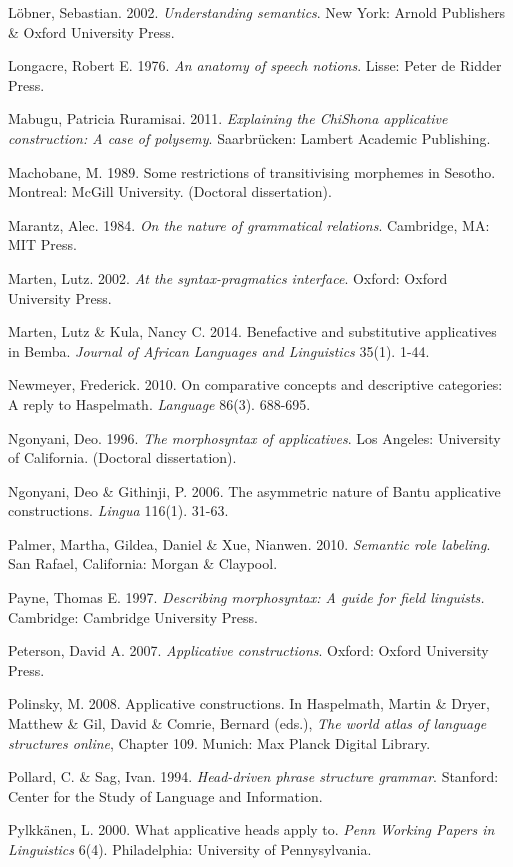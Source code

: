 \documentclass[output=paper]{langsci/langscibook}
\begin{document}
Löbner, Sebastian. 2002. \textit{Understanding semantics}. New York: Arnold Publishers \& Oxford University Press.

Longacre, Robert E. 1976. \textit{An anatomy of speech notions}. Lisse: Peter de Ridder Press.

Mabugu, Patricia Ruramisai. 2011. \textit{Explaining the ChiShona applicative construction: A case of polysemy}. Saarbrücken: Lambert Academic Publishing.

Machobane, M. 1989. Some restrictions of transitivising morphemes in Sesotho. Montreal: McGill University. (Doctoral dissertation).

Marantz, Alec. 1984. \textit{On the nature of grammatical relations}. Cambridge, MA: MIT Press.

Marten, Lutz. 2002. \textit{At the syntax-pragmatics interface}. Oxford: Oxford University Press.

Marten, Lutz \& Kula, Nancy C. 2014. Benefactive and substitutive applicatives in Bemba. \textit{Journal of African Languages and Linguistics} 35(1). 1-44.

Newmeyer, Frederick.  2010. On comparative concepts and descriptive categories: A reply to Haspelmath. \textit{Language }86(3). 688-695.

Ngonyani, Deo. 1996. \textit{The morphosyntax of applicatives}. Los Angeles: University of California. (Doctoral dissertation).

Ngonyani, Deo \& Githinji, P. 2006. The asymmetric nature of Bantu applicative constructions. \textit{Lingua }116(1). 31-63.

Palmer, Martha, Gildea, Daniel \& Xue, Nianwen. 2010. \textit{Semantic role labeling}. San Rafael, California: Morgan \& Claypool.

Payne, Thomas E. 1997. \textit{Describing morphosyntax: A guide for field linguists.} Cambridge: Cambridge University Press. 

Peterson, David A.  2007. \textit{Applicative constructions}. Oxford: Oxford University Press.

Polinsky, M. 2008. Applicative constructions. In Haspelmath, Martin \& Dryer, Matthew \& Gil, David \& Comrie, Bernard (eds.), \textit{The world atlas of language structures online}, Chapter 109. Munich: Max Planck Digital Library.

Pollard, C. \& Sag, Ivan. 1994. \textit{Head-driven phrase structure grammar}. Stanford: Center for the Study of Language and Information.

Pylkkänen, L. 2000. What applicative heads apply to. \textit{Penn Working Papers in Linguistics }6(4). Philadelphia: University of Pennysylvania.
\end{document}
